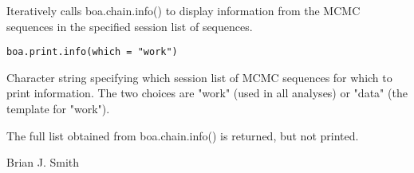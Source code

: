 \begin{Description}\relax
Iteratively calls boa.chain.info() to display information from the MCMC 
sequences in the specified session list of sequences.
\end{Description}
\begin{Usage}
\begin{verbatim}
boa.print.info(which = "work")
\end{verbatim}
\end{Usage}
\begin{Arguments}
\begin{ldescription}
\item[\code{which}] Character string specifying which session list of MCMC sequences 
for which to print information. The two choices are "work" (used in all 
analyses) or "data" (the template for "work").
\end{ldescription}
\end{Arguments}
\begin{Value}
The full list obtained from boa.chain.info() is returned, but not printed.
\end{Value}
\begin{Author}\relax
Brian J. Smith
\end{Author}
\begin{SeeAlso}\relax
{}
\end{SeeAlso}

